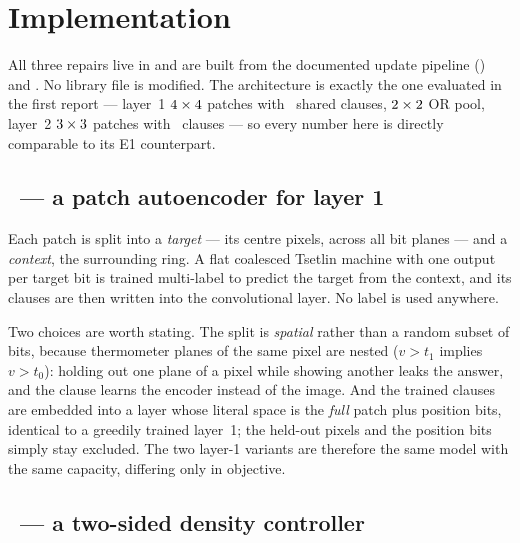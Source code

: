 \section{Implementation}
\label{sec:method}

All three repairs live in  and are built from the documented update pipeline
() and . No library file is
modified. The architecture is exactly the one evaluated in the first report --- layer~1
$4\times4$ patches with \cOne\ shared clauses, $2\times2$ OR pool, layer~2
$3\times3$ patches with \cTwo\ clauses --- so every number here is directly comparable
to its E1 counterpart.

\subsection{\ideaA\ --- a patch autoencoder for layer 1}
\label{sec:method-auto}

Each patch is split into a \emph{target} --- its centre pixels, across all bit planes --- and
a \emph{context}, the surrounding ring. A flat coalesced Tsetlin machine with one output per
target bit is trained multi-label to predict the target from the context, and its clauses are
then written into the convolutional layer. No label is used anywhere.

Two choices are worth stating. The split is \emph{spatial} rather than a random subset of
bits, because thermometer planes of the same pixel are nested ($v>t_1$ implies $v>t_0$):
holding out one plane of a pixel while showing another leaks the answer, and the clause learns
the encoder instead of the image. And the trained clauses are embedded into a layer whose
literal space is the \emph{full} patch plus position bits, identical to a greedily trained
layer~1; the held-out pixels and the position bits simply stay excluded. The two layer-1
variants are therefore the same model with the same capacity, differing only in objective.

\subsection{\ideaB\ --- a two-sided density controller}
\label{sec:method-calib}

